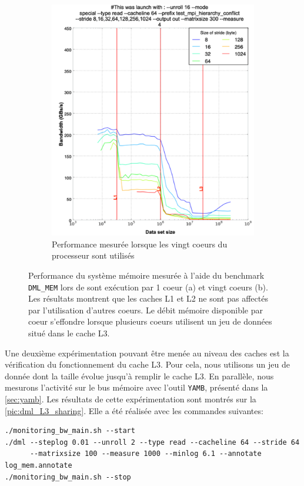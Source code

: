 \begin{figure}
\begin{subfigure}[b]{0.47\linewidth}
            \includegraphics[width=\linewidth]{images/dml_cache_20core.png}
            \caption{Performance mesurée lorsque les vingt coeurs du processeur sont utilisés}
            \label{pic:dml_cache_20core}
            \end{subfigure}
        \caption{Performance du système mémoire mesurée à l'aide du benchmark \texttt{DML\_MEM} lors de sont exécution par 1 coeur (a) et vingt coeurs (b). Les résultats montrent que les caches L1 et L2 ne sont pas affectés par l'utilisation d'autres coeurs. Le débit mémoire disponible par coeur s'effondre lorsque plusieurs coeurs utilisent un jeu de données situé dans le cache L3.}\label{pic:dml_cache}
        \end{figure}
        
        Une deuxième expérimentation pouvant être menée au niveau des caches est la vérification du fonctionnement du cache L3. Pour cela, nous utilisons un jeu de donnée dont la taille évolue jusqu'à remplir le cache L3.  En parallèle, nous mesurons l'activité sur le bus mémoire avec l'outil \verb=YAMB=, présenté dans la \autoref{sec:yamb}. Les résultats de cette expérimentation sont montrés sur la \autoref{pic:dml_L3_sharing}. Elle a été réalisée avec les commandes suivantes:
        \begin{verbatim}
./monitoring_bw_main.sh --start
./dml --steplog 0.01 --unroll 2 --type read --cacheline 64 --stride 64  
      --matrixsize 100 --measure 1000 --minlog 6.1 --annotate log_mem.annotate
./monitoring_bw_main.sh --stop
        \end{verbatim}
        
